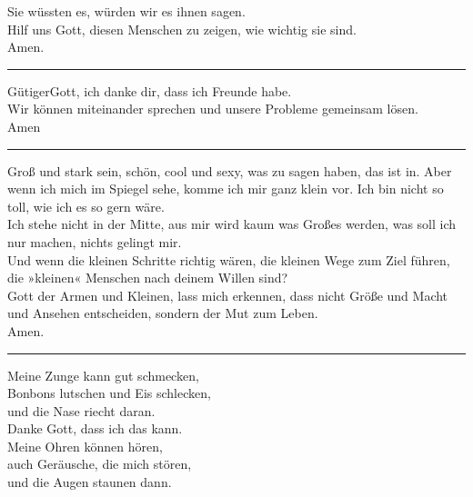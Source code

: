 Sie wüssten es, würden wir es ihnen sagen.\\
Hilf uns Gott, diesen Menschen zu zeigen, wie wichtig sie sind.\\ \newline
Amen.\\
\par\noindent\rule{\textwidth}{0.4pt} \newline \newline
GütigerGott, ich danke dir, dass ich Freunde habe.\\ 
Wir können miteinander sprechen und unsere Probleme gemeinsam lösen.\\ \newline
Amen\\
\par\noindent\rule{\textwidth}{0.4pt} \newline \newline
Groß und stark sein, schön, cool und sexy, was zu sagen haben, das ist in. Aber wenn ich mich im Spiegel sehe, komme ich mir ganz klein vor. Ich bin nicht so toll, wie ich es so gern wäre.\\ \newline 
Ich stehe nicht in der Mitte, aus mir wird kaum was Großes werden, was soll ich nur machen, nichts gelingt mir. \\ \newline
Und wenn die kleinen Schritte richtig wären, die kleinen Wege zum Ziel führen, die »kleinen« Menschen nach deinem Willen sind? \\ \newline
Gott der Armen und Kleinen, lass mich erkennen, dass nicht Größe und Macht und Ansehen entscheiden, sondern der Mut zum Leben.\\ \newline
Amen.\\
\par\noindent\rule{\textwidth}{0.4pt} \newline \newline
Meine Zunge kann gut schmecken,\\
Bonbons lutschen und Eis schlecken, \\
und die Nase riecht daran.\\
Danke Gott, dass ich das kann.\\ \newline
Meine Ohren können hören,\\
 auch Geräusche, die mich stören,\\
 und die Augen staunen dann.\\
